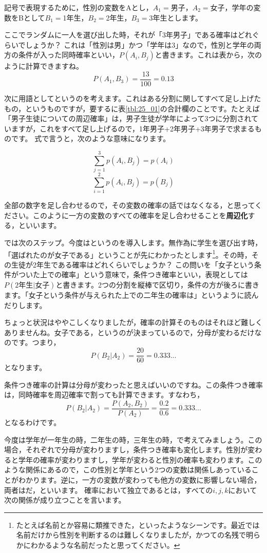 \documentclass{ltjbook}
\begin{document}
記号で表現するために，性別の変数をAとし，$A_1=$男子，$A_2=$女子，学年の変数をBとして$B_1=$1年生，$B_2=$2年生，$B_3=$3年生とします。

ここでランダムに一人を選び出した時，それが「3年男子」である確率はどれぐらいでしょうか？ これは「性別は男」かつ「学年は3」なので，性別と学年の両方の条件が入った同時確率といい，$P(A_i,B_j)$と書きます。これは表から，次のように計算できますね。
\[ P(A_1,B_3)= \frac{13}{100}=0.13 \]

次に用語としてというのを考えます。これはある分割に関してすべて足し上げたもの，というものですが，要するに表\ref{tbl:25_01}の合計欄のことです。たとえば「男子生徒についての周辺確率」は，男子生徒が学年によって3つに分割されていますが，これをすべて足し上げるので，1年男子+2年男子+3年男子で求まるものです。
式で言うと，次のような意味になります。

\[ \sum_{j=1}^3 p(A_i,B_j) = p(A_i) \]
\[ \sum_{i=1}^2 p(A_i,B_j) = p(B_j) \]

全部の数字を足し合わせるので，その変数の確率の話ではなくなる，と思ってください。このように一方の変数のすべての確率を足し合わせることを\textbf{周辺化}する，といいます。

では次のステップ。今度はというのを導入します。無作為に学生を選び出す時，「選ばれたのが女子である」ということが先にわかったとします\footnote{たとえば名前とか容易に類推できた，といったようなシーンです。最近では名前だけから性別を判断するのは難しくなりましたが，かつての名残で明らかにわかるような名前だったと思ってください。}。その時，その生徒が2年生である確率はどれくらいでしょうか？ この問いを「女子という条件がついた上での確率」という意味で，条件つき確率といい，表現としては$P(\mbox{2年生}|\mbox{女子})$と書きます。2つの分割を縦棒で区切り，条件の方が後ろに書きます。「女子という条件が与えられた上での二年生の確率は」というように読んだりします。

ちょっと状況はややこしくなりましたが，確率の計算そのものはそれほど難しくありませんね。女子である，というのが決まっているので，分母が変わるだけなのです。つまり，
\[P(B_2|A_2)=\frac{20}{60}=0.333... \]
となります。

条件つき確率の計算は分母が変わったと思えばいいのですね。この条件つき確率は，同時確率を周辺確率で割っても計算できます。すなわち，
\[ P(B_2|A_2) = \frac{P(A_2,B_2)}{P(A_2)}=\frac{0.2}{0.6}=0.333... \]
となるわけです。

今度は学年が一年生の時，二年生の時，三年生の時，で考えてみましょう。この場合，それぞれで分母が変わりますし，条件つき確率も変化します。性別が変わると学年の確率が変わりますし，学年が変わると性別の確率も変わります。このような関係にあるので，この性別と学年という2つの変数は関係しあっていることがわかります。逆に，一方の変数が変わっても他方の変数に影響しない場合，両者はだ，といいます。
確率において独立であるとは，すべての$i,j,k$において次の関係が成り立つことを言います。
\end{document}
